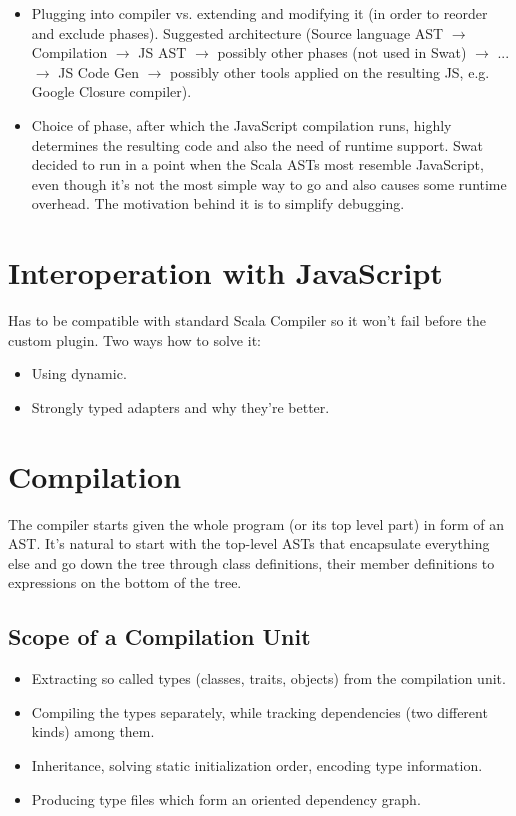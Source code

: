 \documentclass[12pt,a4paper]{report}
\begin{document}
\begin{itemize}
\item Plugging into compiler vs. extending and modifying it (in order to reorder and exclude phases). Suggested architecture (Source language AST $\rightarrow$ Compilation $\rightarrow$ JS AST $\rightarrow$ possibly other phases (not used in Swat) $\rightarrow$ ... $\rightarrow$ JS Code Gen $\rightarrow$ possibly other tools applied on the resulting JS, e.g. Google Closure compiler). 
\item Choice of phase, after which the JavaScript compilation runs, highly determines the resulting code and also the need of runtime support. Swat decided to run in a point when the Scala ASTs most resemble JavaScript, even though it's not the most simple way to go and also causes some runtime overhead. The motivation behind it is to simplify debugging.
\end{itemize}

\section{Interoperation with JavaScript}

Has to be compatible with standard Scala Compiler so it won't fail before the custom plugin. Two ways how to solve it: 
\begin{itemize}
\item Using dynamic.
\item Strongly typed adapters and why they're better.
\end{itemize}

\section{Compilation}

The compiler starts given the whole program (or its top level part) in form of an AST. It's natural to start with the top-level ASTs that encapsulate everything else and go down the tree through class definitions, their member definitions to expressions on the bottom of the tree.

\subsection{Scope of a Compilation Unit}

\begin{itemize}
\item Extracting so called types (classes, traits, objects) from the compilation unit.
\item Compiling the types separately, while tracking dependencies (two different kinds) among them.
\item Inheritance, solving static initialization order, encoding type information.
\item Producing type files which form an oriented dependency graph.
\end{itemize}
\end{document}
